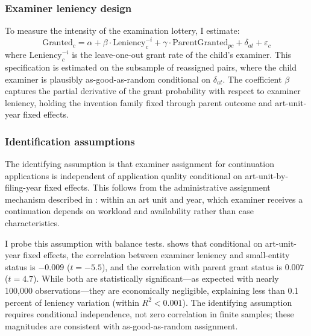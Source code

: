 \documentclass[12pt]{article}
\begin{document}
\subsubsection*{Examiner leniency design} To measure the intensity of the examination lottery, I estimate:
\begin{equation}
\text{Granted}_c = \alpha + \beta \cdot \text{Leniency}_c^{-i} + \gamma \cdot \text{ParentGranted}_{pc} + \delta_{at} + \varepsilon_c
\label{eq:leniency}
\end{equation}
where $\text{Leniency}_c^{-i}$ is the leave-one-out grant rate of the child's examiner. This specification is estimated on the subsample of reassigned pairs, where the child examiner is plausibly as-good-as-random conditional on $\delta_{at}$. The coefficient $\beta$ captures the partial derivative of the grant probability with respect to examiner leniency, holding the invention family fixed through parent outcome and art-unit-year fixed effects.

\subsubsection*{Identification assumptions} The identifying assumption is that examiner assignment for continuation applications is independent of application quality conditional on art-unit-by-filing-year fixed effects. This follows from the administrative assignment mechanism described in : within an art unit and year, which examiner receives a continuation depends on workload and availability rather than case characteristics.

I probe this assumption with balance tests.  shows that conditional on art-unit-year fixed effects, the correlation between examiner leniency and small-entity status is $-0.009$ ($t = -5.5$), and the correlation with parent grant status is $0.007$ ($t = 4.7$). While both are statistically significant---as expected with nearly 100,000 observations---they are economically negligible, explaining less than 0.1 percent of leniency variation (within $R^2 < 0.001$). The identifying assumption requires conditional independence, not zero correlation in finite samples; these magnitudes are consistent with as-good-as-random assignment.
\end{document}

